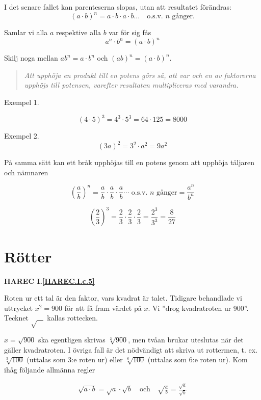 I det senare fallet kan parenteserna slopas, utan att resultatet förändras:
\[
(a \cdot b)^n = a \cdot b \cdot a \cdot b \ldots
\quad \text{o.s.v. }n\text{ gånger.}
\]

Samlar vi alla \(a\) respektive alla \(b\) var för sig fås
\[a^n \cdot b^n = (a \cdot b)^n\]

Skilj noga mellan \(ab^n = a \cdot b^n\) och \((ab)^n = (a \cdot b)^n\).

\begin{quote}\emph{
Att upphöja en produkt till en potens görs så, att var och en av faktorerna
upphöjs till potensen, varefter resultaten multipliceras med varandra.
}\end{quote}

Exempel 1.

\[
(4 \cdot 5)^3 = 4^3 \cdot 5^3 = 64 \cdot 125 = 8000
\]

Exempel 2.
\[
(3a)^2 = 3^2 \cdot a^2 = 9a^2
\]

På samma sätt kan ett bråk upphöjas till en potens genom att upphöja täljaren
och nämnaren

\[
\left(\frac{a}{b}\right)^n =
\frac{a}{b} \cdot \frac{a}{b} \cdot \frac{a}{b} \cdots
\text{ o.s.v. }n\text{ gånger}
= \frac{a^n}{b^n}
\]

\[
\left(\frac{2}{3}\right)^3 = \frac{2}{3} \cdot \frac{2}{3} \cdot \frac{2}{3} =
\frac{2^3}{3^3} = \frac{8}{27}
\]

\section{Rötter}
\textbf{HAREC I.\ref{HAREC.I.c.5}\label{myHAREC.I.c.5}}

Roten ur ett tal är den faktor, vars kvadrat är talet.
Tidigare behandlade vi uttrycket \(x^2 = 900\) för att få fram värdet på \(x\). Vi
''drog kvadratroten ur 900''.
Tecknet \(\sqrt{\ \ \ \ }\) kallas rottecken.

\(x = \sqrt{900}\) ska egentligen skrivas \(\sqrt[2]{900}\),
men tvåan brukar uteslutas när det gäller kvadratroten. I övriga fall är det
nödvändigt att skriva ut rottermen, t. ex. \(\sqrt[3]{100}\) (uttalas
som 3:e roten ur) eller \(\sqrt[6]{100}\) (uttalas som 6:e roten ur).
Kom ihåg följande allmänna regler

\begin{gather*}
  \sqrt{a \cdot b} = \sqrt{a} \cdot \sqrt{b}
  \quad \text{och} \quad
  \sqrt{\frac{a}{b}} = \frac{\sqrt{a}}{\sqrt{b}}
\end{gather*}

